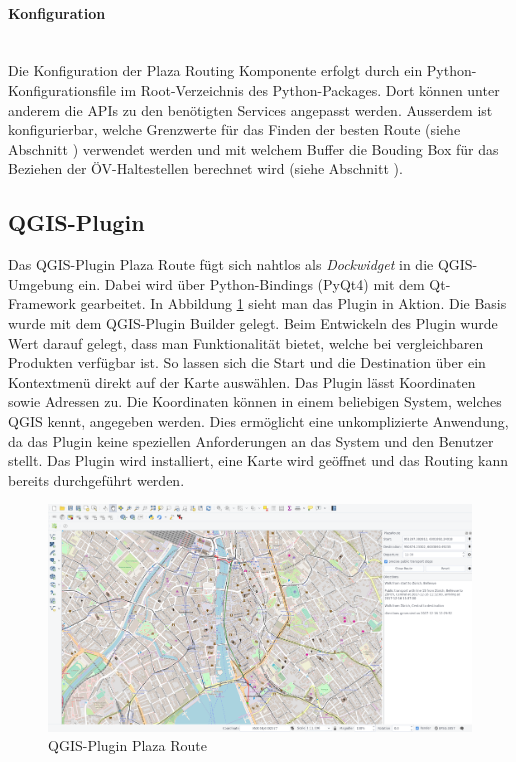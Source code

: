 \paragraph{Konfiguration}\label{impl:PlazaRouting_Konfiguration}~\\
Die Konfiguration der Plaza Routing Komponente erfolgt durch ein Python-Konfigurationsfile im Root-Verzeichnis des Python-Packages. Dort können unter anderem die \ac{API}s zu den benötigten Services angepasst werden. Ausserdem ist konfigurierbar, welche Grenzwerte für das Finden der besten Route (siehe Abschnitt ) verwendet werden und mit welchem Buffer die Bouding Box für das Beziehen der ÖV-Haltestellen berechnet wird (siehe Abschnitt ).

\subsection{QGIS-Plugin}
\label{impl:QGIS-Plugin}
Das \gls{QGIS}-Plugin Plaza Route \cite{github:PlazaRoute-qgis-plugin} fügt sich nahtlos als \emph{Dockwidget} in die QGIS-Umgebung ein. Dabei wird über Python-Bindings (PyQt4) mit dem Qt-Framework gearbeitet. In Abbildung \ref{fig:qgis_plugin_plaza_route} sieht man das Plugin in Aktion. Die Basis wurde mit dem QGIS-Plugin Builder \cite{qgis_plugin_builder} gelegt. Beim Entwickeln des Plugin wurde Wert darauf gelegt, dass man Funktionalität bietet, welche bei vergleichbaren Produkten verfügbar ist. So lassen sich die Start und die Destination über ein Kontextmenü direkt auf der Karte auswählen. Das Plugin lässt Koordinaten sowie Adressen zu. Die Koordinaten können in einem beliebigen System, welches QGIS kennt, angegeben werden. Dies ermöglicht eine unkomplizierte Anwendung, da das Plugin keine speziellen Anforderungen an das System und den Benutzer stellt. Das Plugin wird installiert, eine Karte wird geöffnet und das Routing kann bereits durchgeführt werden.

\begin{figure}[ht]
\centering
\includegraphics[width=1.0\linewidth]{projectdoc/img/qgis_plugin_plaza_route}
\caption[QGIS-Plugin Plaza Route]{QGIS-Plugin Plaza Route}
\label{fig:qgis_plugin_plaza_route}
\end{figure}

